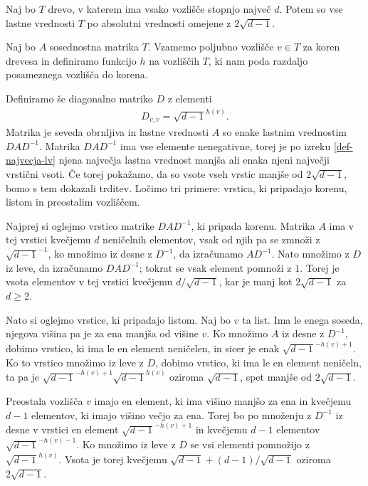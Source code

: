 \begin{izrek}\label{lastne-vrednosti-drevesa}
    Naj bo \(T\) drevo, v katerem ima vsako vozlišče stopnjo največ \(d\). Potem so vse lastne vrednosti \(T\) po absolutni vrednosti omejene z \(2\sqrt{d-1}\).
\end{izrek}
\begin{dokaz}
    Naj bo \(A\) sosednostna matrika \(T\). Vzamemo poljubno vozlišče \(v\in T\) za koren drevesa in definiramo funkcijo \(h\) na vozliščih \(T\), ki nam poda razdaljo posameznega vozlišča do korena.

    Definiramo še diagonalno matriko \(D\) z elementi
    \begin{align*}
        D_{v, v} = \sqrt{d-1}^{h(v)}.
    \end{align*}
    Matrika je seveda obrnljiva in lastne vrednosti \(A\) so enake lastnim vrednostim \(D A D^{-1}\). Matrika \(DAD^{-1}\) ima vse elemente nenegativne, torej je po izreku \ref{def-najvecja-lv} njena največja lastna vrednost manjša ali enaka njeni največji vrstični vsoti. Če torej pokažamo, da so vsote vseh vrstic manjše od \(2\sqrt{d-1}\), bomo s tem dokazali trditev. Ločimo tri primere: vrstica, ki pripadajo korenu, listom in preostalim vozliščem.

    Najprej si oglejmo vrstico matrike \(DAD^{-1}\), ki pripada korenu. Matrika \(A\) ima v tej vrstici kvečjemu \(d\) neničelnih elementov, vsak od njih pa se zmnoži z \(\sqrt{d-1}^{-1}\), ko množimo iz desne z \(D^{-1}\), da izračunamo \(AD^{-1}\). Nato množimo z \(D\) iz leve, da izračunamo \(DAD^{-1}\); tokrat se vsak element pomnoži z \(1\). Torej je vsota elementov v tej vrstici kvečjemu \(d/\sqrt{d-1}\), kar je manj kot \(2\sqrt{d-1}\) za \(d\geq 2\).

    Nato si oglejmo vrstice, ki pripadajo listom. Naj bo \(v\) ta list. Ima le enega soseda, njegova višina pa je za ena manjša od višine \(v\). Ko množimo \(A\) iz desne z \(D^{-1}\), dobimo vrstico, ki ima le en element neničelen, in sicer je enak \(\sqrt{d-1}^{-h(v)+1}\). Ko to vrstico množimo iz leve z \(D\), dobimo vrstico, ki ima le en element neničeln, ta pa je \(\sqrt{d-1}^{-h(v)+1}\sqrt{d-1}^{h(v)}\) oziroma \(\sqrt{d-1}\), spet manjše od \(2\sqrt{d-1}\).

    Preostala vozlišča \(v\) imajo en element, ki ima višino manjšo za ena in kvečjemu \(d-1\) elementov, ki imajo višino večjo za ena. Torej bo po množenju z \(D^{-1}\) iz desne v vrstici en element \(\sqrt{d-1}^{-h(v)+1}\) in kvečjemu \(d-1\) elementov \(\sqrt{d-1}^{-h(v)-1}\). Ko množimo iz leve z \(D\) se vsi elementi pomnožijo z \(\sqrt{d-1}^{h(v)}\). Vsota je torej kvečjemu \(\sqrt{d-1} + (d-1)/\sqrt{d-1}\) oziroma \(2\sqrt{d-1}\).
\end{dokaz}

